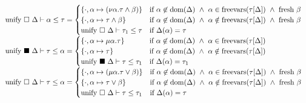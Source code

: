 \documentclass[manuscript]{acmart}
\begin{document}
\begin{figure*}[h]
\[\begin{array}{l @{} l}
      \text{unify } \square\ \Delta \vdash \alpha \leq \tau	
      &{} =
      \begin{cases}  
        \{ \cdot,\alpha \mapsto (\nu\alpha.\tau \wedge \beta) \}
        & \text{if } 
        \alpha \not\in \text{dom}(\Delta) \ \wedge\
        \alpha \in \text{freevars}(\tau[\Delta]) \ \wedge\ 
        \text{fresh } \beta
        \\
        \{ \cdot,\alpha \mapsto \tau \wedge \beta \}
        & \text{if } 
        \alpha \not\in \text{dom}(\Delta) \ \wedge\
        \alpha \notin \text{freevars}(\tau[\Delta]) \ \wedge\ 
        \text{fresh } \beta
        \\
        \text{unify } \square\ \Delta \vdash \tau_1 \leq \tau
        &\text{if }
        \Delta(\alpha) = \tau
      \end{cases}
      \\
      \text{unify } \blacksquare\ \Delta \vdash \tau \leq \alpha 	
      &{} =
      \begin{cases}  
        \{ \cdot,\alpha \mapsto \mu\alpha.\tau \}
        & \text{if } 
        \alpha \not\in \text{dom}(\Delta) \ \wedge\
        \alpha \in \text{freevars}(\tau[\Delta])
        \\
        \{ \cdot,\alpha \mapsto \tau \}
        & \text{if } 
        \alpha \not\in \text{dom}(\Delta) \ \wedge\
        \alpha \notin \text{freevars}(\tau[\Delta])
        \\
        \text{unify } \blacksquare\ \Delta \vdash \tau \leq \tau_1
        &\text{if }
        \Delta(\alpha) = \tau_1
      \end{cases}
      \\
      \text{unify } \square\ \Delta \vdash \tau \leq \alpha	
      &{} =
      \begin{cases}  
        \{ \cdot,\alpha \mapsto (\mu\alpha.\tau \vee \beta) \}
        & \text{if } 
        \alpha \not\in \text{dom}(\Delta) \ \wedge\
        \alpha \in \text{freevars}(\tau[\Delta]) \ \wedge\ 
        \text{fresh } \beta
        \\
        \{ \cdot,\alpha \mapsto \tau \vee \beta \}
        & \text{if } 
        \alpha \not\in \text{dom}(\Delta) \ \wedge\
        \alpha \notin \text{freevars}(\tau[\Delta]) \ \wedge\ 
        \text{fresh } \beta
        \\
        \text{unify } \square\ \Delta \vdash \tau \leq \tau_1
        &\text{if }
        \Delta(\alpha) = \tau
      \end{cases}
      \\

\end{array}\]
\end{figure*}
\end{document}
